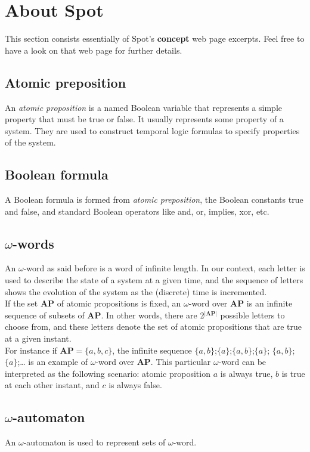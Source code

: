 \section{About Spot}
This section consists essentially of Spot's \textbf{concept} web page excerpts\cite{8}. Feel free to have a
look on that web page for further details.

\subsection{Atomic preposition}
An \textit{atomic proposition} is a named Boolean variable that represents a simple property that must be
true or false. It usually represents some property of a system. They are used to construct temporal logic
formulas\cite{13} to specify properties of the system.

\subsection{Boolean formula}
A Boolean formula is formed from \textit{atomic preposition}, the Boolean constants true and false, and
standard Boolean operators like and, or, implies, xor, etc.

\subsection{$\omega$-words}
An $\omega$-word as said before is a word of infinite length. In our context, each letter is used to
describe the state of a system at a given time, and the sequence of letters shows the evolution of the
system as the (discrete) time is incremented.\\

If the set \textbf{AP} of atomic propositions is fixed, an $\omega$-word over \textbf{AP} is an infinite
sequence of subsets of \textbf{AP}. In other words, there are 2$^{|\textbf{AP}|}$ possible letters to
choose from, and these letters denote the set of atomic propositions that are true at a given instant.\\

For instance if \textbf{AP}$=\{a,b,c\}$, the infinite sequence $\{a,b\}$;$\{a\}$;$\{a,b\}$;$\{a\}$;
$\{a,b\}$;$\{a\}$;… is an example of $\omega$-word over \textbf{AP}. This particular $\omega$-word can be
interpreted as the following scenario: atomic proposition $a$ is always true, $b$ is true at each other
instant, and $c$ is always false.

\subsection{$\omega$-automaton}
An $\omega$-automaton is used to represent sets of $\omega$-word.\\

